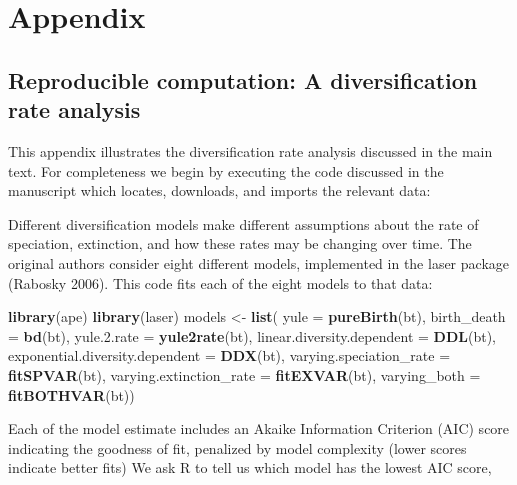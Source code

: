 \documentclass[author-year, review, 12pt]{elsarticle} %
\newenvironment{Shaded}{}{}
\newcommand{\KeywordTok}[1]{\textcolor[rgb]{0.00,0.44,0.13}{\textbf{{#1}}}}
\newcommand{\DataTypeTok}[1]{\textcolor[rgb]{0.56,0.13,0.00}{{#1}}}
\newcommand{\NormalTok}[1]{{#1}}
\begin{document}
\begin{frontmatter}
  \title{}
  \author[cpb]{Carl Boettiger}
  \address[cpb]{Center for Population Biology, University of California, Davis, California 95616}
  \author[stats]{Duncan Temple Lang}
  \address[stats]{Department of Statistics, University of California, Davis, California 95616}
 \end{frontmatter}


\section{Appendix}

\subsection{Reproducible computation: A diversification rate analysis}

This appendix illustrates the diversification rate analysis discussed in
the main text. For completeness we begin by executing the code discussed
in the manuscript which locates, downloads, and imports the relevant
data:

Different diversification models make different assumptions about the
rate of speciation, extinction, and how these rates may be changing over
time. The original authors consider eight different models, implemented
in the laser package (Rabosky 2006). This code fits each of the eight
models to that data:

\begin{Shaded}
\begin{Highlighting}[]
\KeywordTok{library}\NormalTok{(ape)}
\KeywordTok{library}\NormalTok{(laser)}
\NormalTok{models <- }\KeywordTok{list}\NormalTok{(}
  \DataTypeTok{yule =} \KeywordTok{pureBirth}\NormalTok{(bt),  }
  \DataTypeTok{birth_death =} \KeywordTok{bd}\NormalTok{(bt),     }
  \DataTypeTok{yule.2.rate =} \KeywordTok{yule2rate}\NormalTok{(bt),}
  \DataTypeTok{linear.diversity.dependent =} \KeywordTok{DDL}\NormalTok{(bt),    }
  \DataTypeTok{exponential.diversity.dependent =} \KeywordTok{DDX}\NormalTok{(bt),}
  \DataTypeTok{varying.speciation_rate =} \KeywordTok{fitSPVAR}\NormalTok{(bt),  }
  \DataTypeTok{varying.extinction_rate =} \KeywordTok{fitEXVAR}\NormalTok{(bt),  }
  \DataTypeTok{varying_both =} \KeywordTok{fitBOTHVAR}\NormalTok{(bt))}
\end{Highlighting}
\end{Shaded}
Each of the model estimate includes an Akaike Information Criterion
(AIC) score indicating the goodness of fit, penalized by model
complexity (lower scores indicate better fits) We ask R to tell us which
model has the lowest AIC score,
\end{document}

